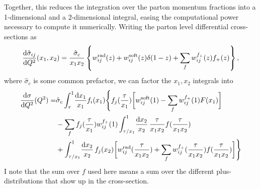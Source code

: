 \documentclass[../main.tex]{subfiles}
\begin{document}
Together, this reduces the integration over the parton momentum fractions into a 1-dimensional and a 2-dimensional integral, easing the computational power necessary to compute it numerically.
Writing the parton level differential cross-sections as
\begin{equation}
  \label{had:eq:parton_xsec_decomposition}
  \d[Q^2]{\hat\sigma_{ij}}(x_1, x_2) = \frac{\hat\sigma_c}{x_1 x_2} \cclosed{w_{ij}^\text{rad}(z) + w_{ij}^\text{soft}(z) \delta(1-z) + \sum_{f} w_{ij}^{f_+}(z) f_+(z)},
\end{equation}
where \(\hat\sigma_c\) is some common prefactor, we can factor the \(x_1, x_2\) integrals into
\begin{align}
  \label{had:eq:hadron_xsec_integral}
  \nonumber
  \d[Q^2]{\sigma}(Q^2) = & \hat\sigma_c \int_{\tau}^1 \! \frac{\mathrm{d}x_1}{x_1} f_i(x_1) \Bigg\{ f_j(\frac{\tau}{x_1})\biggl[w^\text{soft}_{ij}(1) - \sum_f w^{f_+}_{ij}(1) F(x_1)\biggr]                           \\
  \nonumber
                         & -  \sum_f f_j(\frac{\tau}{x_1}) w^{f_+}_{ij}(1) \int_{\tau/x_1}^1\!\frac{\mathrm{d}x_2}{x_2}\, \frac{\tau}{x_1 x_2} f(\frac{\tau}{x_1x_2})                                                  \\
                         & + \int_{\tau/x_1}^1\!\frac{\mathrm{d}x_2}{x_2}\, f_j(x_2) \biggl[w^\text{rad}_{ij}(\frac{\tau}{x_1 x_2}) + \sum_f w^{f_+}_{ij}(\frac{\tau}{x_1 x_2}) f(\frac{\tau}{x_1 x_2})\biggr] \Bigg\}
\end{align}
I note that the sum over \(f\) used here means a sum over the different plus-distributions that show up in the cross-section.
\end{document}
